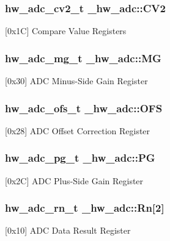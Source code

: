 \subsubsection[{\texorpdfstring{C\+V2}{CV2}}]{ {\bf hw\+\_\+adc\+\_\+cv2\+\_\+t} \+\_\+hw\+\_\+adc\+::\+C\+V2}\hypertarget{struct__hw__adc_a493cd16657860f376172a537134e398c}{}\label{struct__hw__adc_a493cd16657860f376172a537134e398c}
\mbox{[}0x1C\mbox{]} Compare Value Registers 
\subsubsection[{\texorpdfstring{MG}{MG}}]{ {\bf hw\+\_\+adc\+\_\+mg\+\_\+t} \+\_\+hw\+\_\+adc\+::\+MG}\hypertarget{struct__hw__adc_ad0bf8a55fde0c12dd8cd242161962726}{}\label{struct__hw__adc_ad0bf8a55fde0c12dd8cd242161962726}
\mbox{[}0x30\mbox{]} A\+DC Minus-\/\+Side Gain Register 
\subsubsection[{\texorpdfstring{O\+FS}{OFS}}]{ {\bf hw\+\_\+adc\+\_\+ofs\+\_\+t} \+\_\+hw\+\_\+adc\+::\+O\+FS}\hypertarget{struct__hw__adc_a8eb5ec94c3a10efd8b76e03b017c283f}{}\label{struct__hw__adc_a8eb5ec94c3a10efd8b76e03b017c283f}
\mbox{[}0x28\mbox{]} A\+DC Offset Correction Register 
\subsubsection[{\texorpdfstring{PG}{PG}}]{ {\bf hw\+\_\+adc\+\_\+pg\+\_\+t} \+\_\+hw\+\_\+adc\+::\+PG}\hypertarget{struct__hw__adc_a996981b3835d1b42d3cdacbc8f7b060c}{}\label{struct__hw__adc_a996981b3835d1b42d3cdacbc8f7b060c}
\mbox{[}0x2C\mbox{]} A\+DC Plus-\/\+Side Gain Register 
\subsubsection[{\texorpdfstring{Rn}{Rn}}]{ {\bf hw\+\_\+adc\+\_\+rn\+\_\+t} \+\_\+hw\+\_\+adc\+::\+Rn\mbox{[}2\mbox{]}}\hypertarget{struct__hw__adc_a6c97822d9f34a22267bf4c6c37820965}{}\label{struct__hw__adc_a6c97822d9f34a22267bf4c6c37820965}
\mbox{[}0x10\mbox{]} A\+DC Data Result Register 
